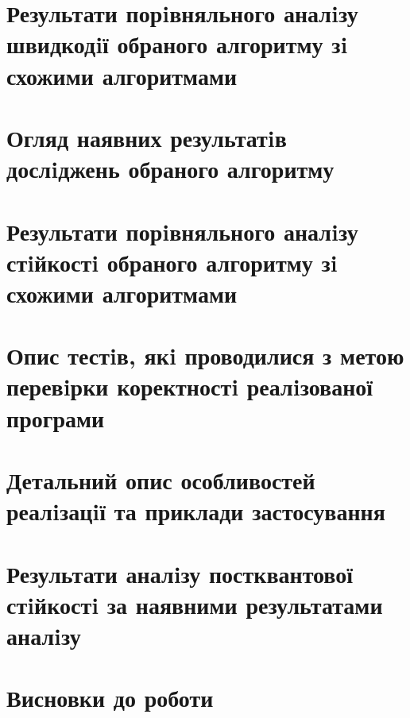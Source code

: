 \documentclass[12pt]{HomusWorkus}
\begin{document}
\section{Результати порiвняльного аналiзу швидкодiї обраного алгоритму зi схожими алгоритмами}

\section{Огляд наявних результатiв дослiджень обраного алгоритму}

\section{Результати порiвняльного аналiзу стiйкостi обраного алгоритму зi схожими алгоритмами}

\section{Опис тестiв, якi проводилися з метою перевiрки коректностi реалiзованої програми}

\section{Детальний опис особливостей реалiзацiї та приклади застосування}

\section{Результати аналiзу постквантової стiйкостi за наявними результатами аналiзу}


\section{Висновки до роботи}



% 
% 
\end{document}
